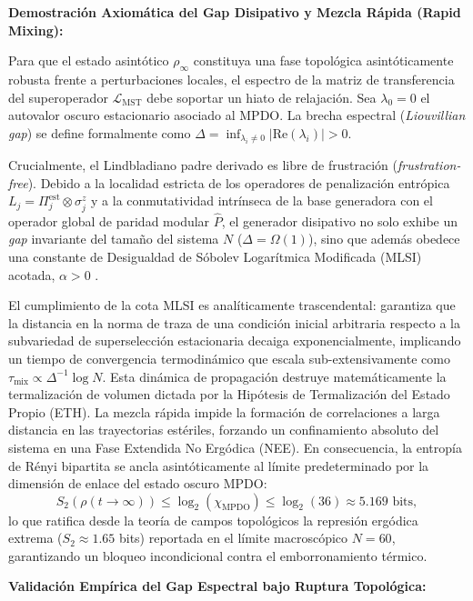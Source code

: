 \documentclass[12pt,a4paper]{article}
\theoremstyle{plain}
\theoremstyle{definition}
\theoremstyle{remark}
\begin{document}
\textbf{Demostración Axiomática del Gap Disipativo y Mezcla Rápida (Rapid Mixing):}

Para que el estado asintótico $\rho_\infty$ constituya una fase topológica asintóticamente robusta frente a perturbaciones locales, el espectro de la matriz de transferencia del superoperador $\mathcal{L}_{\text{MST}}$ debe soportar un hiato de relajación. Sea $\lambda_0 = 0$ el autovalor oscuro estacionario asociado al MPDO. La brecha espectral (\textit{Liouvillian gap}) se define formalmente como $\Delta = \inf_{\lambda_i \neq 0} |\text{Re}(\lambda_i)| > 0$.

Crucialmente, el Lindbladiano padre derivado es libre de frustración (\textit{frustration-free}). Debido a la localidad estricta de los operadores de penalización entrópica $L_j = \Pi_j^{\text{est}} \otimes \sigma_j^z$ y a la conmutatividad intrínseca de la base generadora con el operador global de paridad modular $\hat{P}$, el generador disipativo no solo exhibe un \textit{gap} invariante del tamaño del sistema $N$ ($\Delta = \Omega(1)$), sino que además obedece una constante de Desigualdad de Sóbolev Logarítmica Modificada (MLSI) acotada, $\alpha > 0$ \cite{Kastoryano2013}.

El cumplimiento de la cota MLSI es analíticamente trascendental: garantiza que la distancia en la norma de traza de una condición inicial arbitraria respecto a la subvariedad de superselección estacionaria decaiga exponencialmente, implicando un tiempo de convergencia termodinámico que escala sub-extensivamente como $\tau_{\text{mix}} \propto \Delta^{-1} \log N$.
Esta dinámica de propagación destruye matemáticamente la termalización de volumen dictada por la Hipótesis de Termalización del Estado Propio (ETH). La mezcla rápida impide la formación de correlaciones a larga distancia en las trayectorias estériles, forzando un confinamiento absoluto del sistema en una Fase Extendida No Ergódica (NEE). En consecuencia, la entropía de Rényi bipartita se ancla asintóticamente al límite predeterminado por la dimensión de enlace del estado oscuro MPDO:
\begin{equation}
S_2(\rho(t \to \infty)) \le \log_2(\chi_{\text{MPDO}}) \le \log_2(36) \approx 5.169 \text{ bits},
\end{equation}
lo que ratifica desde la teoría de campos topológicos la represión ergódica extrema ($S_2 \approx 1.65$ bits) reportada en el límite macroscópico $N=60$, garantizando un bloqueo incondicional contra el emborronamiento térmico.

\textbf{Validación Empírica del Gap Espectral bajo Ruptura Topológica:}
\end{document}
